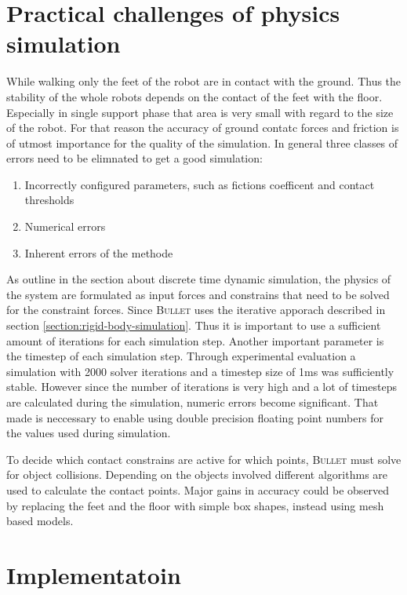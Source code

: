 \documentclass[english,ngerman]{KITreprt}
\newcommand{\name}[1]{\textsc{#1}}
\begin{document}
\section{Practical challenges of physics
simulation}\label{practical-challenges-of-physics-simulation}

While walking only the feet of the robot are in contact with the ground.
Thus the stability of the whole robots depends on the contact of the
feet with the floor. Especially in single support phase that area is
very small with regard to the size of the robot. For that reason the
accuracy of ground contatc forces and friction is of utmost importance
for the quality of the simulation. In general three classes of errors
need to be elimnated to get a good simulation:

\begin{enumerate}
\def\labelenumi{\arabic{enumi}.}
\item
  Incorrectly configured parameters, such as fictions coefficent and
  contact thresholds
\item
  Numerical errors
\item
  Inherent errors of the methode
\end{enumerate}

As outline in the section about discrete time dynamic simulation, the
physics of the system are formulated as input forces and constrains that
need to be solved for the constraint forces. Since \name{Bullet} uses
the iterative apporach described in section
\ref{section:rigid-body-simulation}. Thus it is important to use a
sufficient amount of iterations for each simulation step. Another
important parameter is the timestep of each simulation step. Through
experimental evaluation a simulation with 2000 solver iterations and a
timestep size of 1ms was sufficiently stable. However since the number
of iterations is very high and a lot of timesteps are calculated during
the simulation, numeric errors become significant. That made is
neccessary to enable using double precision floating point numbers for
the values used during simulation.

To decide which contact constrains are active for which points,
\name{Bullet} must solve for object collisions. Depending on the objects
involved different algorithms are used to calculate the contact points.
Major gains in accuracy could be observed by replacing the feet and the
floor with simple box shapes, instead using mesh based models.

\section{Implementatoin}\label{implementatoin}
\end{document}
